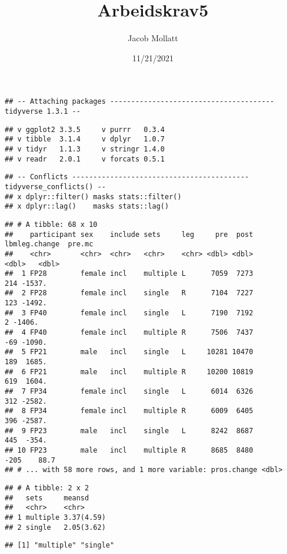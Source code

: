 \documentclass[
]{article}
\title{Arbeidskrav5}
\author{Jacob Mollatt}
\date{11/21/2021}
\begin{document}
\maketitle

\begin{verbatim}
## -- Attaching packages --------------------------------------- tidyverse 1.3.1 --
\end{verbatim}

\begin{verbatim}
## v ggplot2 3.3.5     v purrr   0.3.4
## v tibble  3.1.4     v dplyr   1.0.7
## v tidyr   1.1.3     v stringr 1.4.0
## v readr   2.0.1     v forcats 0.5.1
\end{verbatim}

\begin{verbatim}
## -- Conflicts ------------------------------------------ tidyverse_conflicts() --
## x dplyr::filter() masks stats::filter()
## x dplyr::lag()    masks stats::lag()
\end{verbatim}

\begin{verbatim}
## # A tibble: 68 x 10
##    participant sex    include sets     leg     pre  post lbmleg.change  pre.mc
##    <chr>       <chr>  <chr>   <chr>    <chr> <dbl> <dbl>         <dbl>   <dbl>
##  1 FP28        female incl    multiple L      7059  7273           214 -1537. 
##  2 FP28        female incl    single   R      7104  7227           123 -1492. 
##  3 FP40        female incl    single   L      7190  7192             2 -1406. 
##  4 FP40        female incl    multiple R      7506  7437           -69 -1090. 
##  5 FP21        male   incl    single   L     10281 10470           189  1685. 
##  6 FP21        male   incl    multiple R     10200 10819           619  1604. 
##  7 FP34        female incl    single   L      6014  6326           312 -2582. 
##  8 FP34        female incl    multiple R      6009  6405           396 -2587. 
##  9 FP23        male   incl    single   L      8242  8687           445  -354. 
## 10 FP23        male   incl    multiple R      8685  8480          -205    88.7
## # ... with 58 more rows, and 1 more variable: pros.change <dbl>
\end{verbatim}

\begin{verbatim}
## # A tibble: 2 x 2
##   sets     meansd    
##   <chr>    <chr>     
## 1 multiple 3.37(4.59)
## 2 single   2.05(3.62)
\end{verbatim}

\begin{verbatim}
## [1] "multiple" "single"
\end{verbatim}
\end{document}
